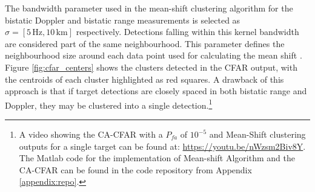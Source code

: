 The bandwidth parameter used in the mean-shift clustering algorithm for the bistatic Doppler and bistatic range measurements is selected as \( \sigma = [5 \, \text{Hz}, 10 \, \text{km}] \) respectively. Detections falling within this kernel bandwidth are considered part of the same neighbourhood. This parameter defines the neighbourhood size around each data point used for calculating the mean shift \cite{Wu2007}. Figure \ref{fig:cfar_centers} shows the clusters detected in the \ac{CFAR} output, with the centroids of each cluster highlighted as red squares. A drawback of this approach is that if target detections are closely spaced in both bistatic range and Doppler, they may be clustered into a single detection.\footnote{A video showing the \ac{CA-CFAR} with a \(P_{fa}\) of \(10^{-5}\) and Mean-Shift clustering outputs for a single target can be found at: \url{https://youtu.be/nWzsm2Biv8Y}. The Matlab code for the implementation of Mean-shift Algorithm and the \ac{CA-CFAR} can be found in the code repository from Appendix \ref{appendix:repo}.}
\newline 
